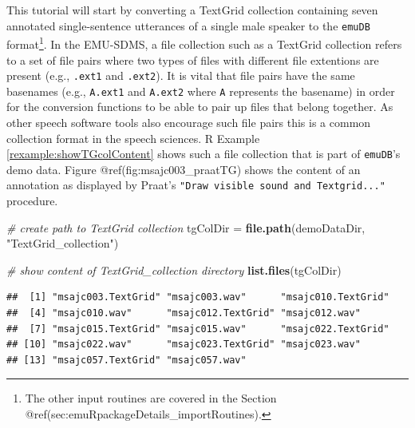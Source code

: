 \documentclass[]{book}
\newenvironment{Shaded}{\begin{snugshade}}{\end{snugshade}}
\newcommand{\KeywordTok}[1]{\textcolor[rgb]{0.13,0.29,0.53}{\textbf{{#1}}}}
\newcommand{\StringTok}[1]{\textcolor[rgb]{0.31,0.60,0.02}{{#1}}}
\newcommand{\CommentTok}[1]{\textcolor[rgb]{0.56,0.35,0.01}{\textit{{#1}}}}
\newcommand{\NormalTok}[1]{{#1}}
\let\rmarkdownfootnote\footnote%
\def\footnote{\protect\rmarkdownfootnote}
\theoremstyle{definition}
\theoremstyle{definition}
\theoremstyle{definition}
\theoremstyle{remark}
\begin{document}
This tutorial will start by converting a TextGrid collection containing
seven annotated single-sentence utterances of a single male speaker to
the \texttt{emuDB} format\footnote{The other input routines are covered
  in the Section @ref(sec:emuRpackageDetails\_importRoutines).}. In the
EMU-SDMS, a file collection such as a TextGrid collection refers to a
set of file pairs where two types of files with different file
extentions are present (e.g., \texttt{.ext1} and \texttt{.ext2}). It is
vital that file pairs have the same basenames (e.g., \texttt{A.ext1} and
\texttt{A.ext2} where \texttt{A} represents the basename) in order for
the conversion functions to be able to pair up files that belong
together. As other speech software tools also encourage such file pairs
\citep[e.g.,][]{kisler:2015a} this is a common collection format in the
speech sciences. R Example \ref{rexample:showTGcolContent} shows such a
file collection that is part of \texttt{emuDB}'s demo data. Figure
@ref(fig:msajc003\_praatTG) shows the content of an annotation as
displayed by Praat's \texttt{"Draw\ visible\ sound\ and\ Textgrid..."}
procedure.

\begin{Shaded}
\begin{Highlighting}[]
\CommentTok{# create path to TextGrid collection}
\NormalTok{tgColDir =}\StringTok{ }\KeywordTok{file.path}\NormalTok{(demoDataDir, }\StringTok{"TextGrid_collection"}\NormalTok{)}

\CommentTok{# show content of TextGrid_collection directory}
\KeywordTok{list.files}\NormalTok{(tgColDir)}
\end{Highlighting}
\end{Shaded}

\begin{verbatim}
##  [1] "msajc003.TextGrid" "msajc003.wav"      "msajc010.TextGrid"
##  [4] "msajc010.wav"      "msajc012.TextGrid" "msajc012.wav"     
##  [7] "msajc015.TextGrid" "msajc015.wav"      "msajc022.TextGrid"
## [10] "msajc022.wav"      "msajc023.TextGrid" "msajc023.wav"     
## [13] "msajc057.TextGrid" "msajc057.wav"
\end{verbatim}
\end{document}

